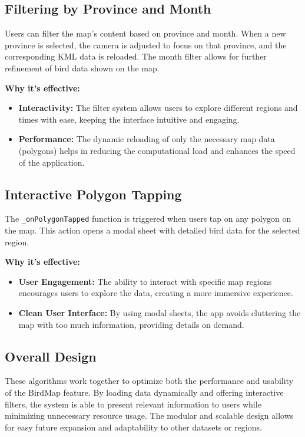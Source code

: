 \documentclass{article}
\begin{document}
\subsection{Filtering by Province and Month}
Users can filter the map’s content based on province and month. When a new province is selected, the camera is adjusted to focus on that province, and the corresponding KML data is reloaded. The month filter allows for further refinement of bird data shown on the map.

\textbf{Why it's effective:}
\begin{itemize}
    \item \textbf{Interactivity:} The filter system allows users to explore different regions and times with ease, keeping the interface intuitive and engaging.
    \item \textbf{Performance:} The dynamic reloading of only the necessary map data (polygons) helps in reducing the computational load and enhances the speed of the application.
\end{itemize}

\subsection{Interactive Polygon Tapping}
The \texttt{\_onPolygonTapped} function is triggered when users tap on any polygon on the map. This action opens a modal sheet with detailed bird data for the selected region.

\textbf{Why it's effective:}
\begin{itemize}
    \item \textbf{User Engagement:} The ability to interact with specific map regions encourages users to explore the data, creating a more immersive experience.
    \item \textbf{Clean User Interface:} By using modal sheets, the app avoids cluttering the map with too much information, providing details on demand.
\end{itemize}

\subsection{Overall Design}
These algorithms work together to optimize both the performance and usability of the BirdMap feature. By loading data dynamically and offering interactive filters, the system is able to present relevant information to users while minimizing unnecessary resource usage. The modular and scalable design allows for easy future expansion and adaptability to other datasets or regions.
\end{document}
